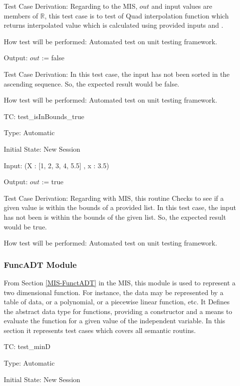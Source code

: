 \documentclass[12pt]{article}
\newcounter{utestnum} %
\begin{document}
\begin{enumerate}[label=TC\arabic*:,ref={\arabic*}]
	Test Case Derivation: Regarding to the MIS, $out$ and input values are members of $\mathbb{R}$, this test case is to test of Quad interpolation function which returns interpolated value which is calculated using provided inputs and .
	
	How test will be performed: Automated test on unit testing framework.


Output: $out$ := false

Test Case Derivation: In this test case, the input has not been sorted in the ascending sequence. So, the expected result would be false.

How test will be performed: Automated test on unit testing framework.

\item [TC\refstepcounter{utestnum}\theutestnum: \label{isInBoundsTest}] 
test\_isInBounds\_true

Type: Automatic

Initial State: New Session

Input: (X : [1, 2, 3, 4, 5.5] , x : 3.5)

Output: $out$ := true

Test Case Derivation: Regarding with MIS, this routine Checks to see if a given value is within the bounds of a provided list. In this test case, the input has not been is within the bounds of the given list. So, the expected result would be true.

How test will be performed: Automated test on unit testing framework.


\subsubsection{FuncADT Module}	
From Section \ref{MIS-FunctADT} in the MIS, this module is used to represent a two dimensional
function.  For instance, the data may be represented by a table of data, or a
polynomial, or a piecewise linear function, etc.
It Defines the abstract data type for functions, providing a
constructor and a means to evaluate the function for a given value of the
independent variable. In this section it represents test cases which covers all semantic routins.



\item [TC\refstepcounter{utestnum}\theutestnum: \label{FuncTminDTest}] 
test\_minD

Type: Automatic

Initial State: New Session


\end{enumerate}
\end{document}

